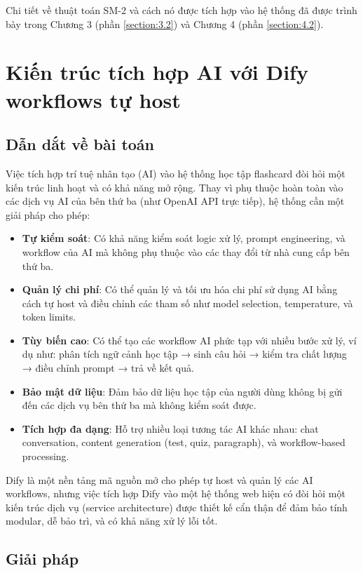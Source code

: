 \documentclass[../DoAn.tex]{subfiles}
\begin{document}
Chi tiết về thuật toán SM-2 và cách nó được tích hợp vào hệ thống đã được trình bày trong Chương 3 (phần \ref{section:3.2}) và Chương 4 (phần \ref{section:4.2}).

\section{Kiến trúc tích hợp AI với Dify workflows tự host}
\label{section:5.2}

\subsection{Dẫn dắt về bài toán}
\label{subsection:5.2.1}

Việc tích hợp trí tuệ nhân tạo (AI) vào hệ thống học tập flashcard đòi hỏi một kiến trúc linh hoạt và có khả năng mở rộng. Thay vì phụ thuộc hoàn toàn vào các dịch vụ AI của bên thứ ba (như OpenAI API trực tiếp), hệ thống cần một giải pháp cho phép:

\begin{itemize}
    \item \textbf{Tự kiểm soát}: Có khả năng kiểm soát logic xử lý, prompt engineering, và workflow của AI mà không phụ thuộc vào các thay đổi từ nhà cung cấp bên thứ ba.
    \item \textbf{Quản lý chi phí}: Có thể quản lý và tối ưu hóa chi phí sử dụng AI bằng cách tự host và điều chỉnh các tham số như model selection, temperature, và token limits.
    \item \textbf{Tùy biến cao}: Có thể tạo các workflow AI phức tạp với nhiều bước xử lý, ví dụ như: phân tích ngữ cảnh học tập → sinh câu hỏi → kiểm tra chất lượng → điều chỉnh prompt → trả về kết quả.
    \item \textbf{Bảo mật dữ liệu}: Đảm bảo dữ liệu học tập của người dùng không bị gửi đến các dịch vụ bên thứ ba mà không kiểm soát được.
    \item \textbf{Tích hợp đa dạng}: Hỗ trợ nhiều loại tương tác AI khác nhau: chat conversation, content generation (test, quiz, paragraph), và workflow-based processing.
\end{itemize}

Dify là một nền tảng mã nguồn mở cho phép tự host và quản lý các AI workflows, nhưng việc tích hợp Dify vào một hệ thống web hiện có đòi hỏi một kiến trúc dịch vụ (service architecture) được thiết kế cẩn thận để đảm bảo tính modular, dễ bảo trì, và có khả năng xử lý lỗi tốt.

\subsection{Giải pháp}
\label{subsection:5.2.2}
\end{document}

